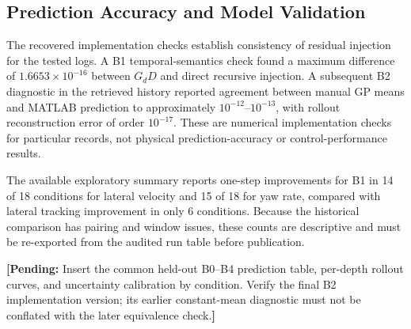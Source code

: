\documentclass[10pt,journal]{IEEEtran}
\newcommand{\pending}[1]{\par\smallskip\noindent\textbf{[Pending:} #1\textbf{]}\par\smallskip}
\begin{document}
\subsection{Prediction Accuracy and Model Validation}
The recovered implementation checks establish consistency of residual injection for the tested logs. A B1 temporal-semantics check found a maximum difference of $1.6653\times10^{-16}$ between $G_dD$ and direct recursive injection. A subsequent B2 diagnostic in the retrieved history reported agreement between manual GP means and MATLAB prediction to approximately $10^{-12}$--$10^{-13}$, with rollout reconstruction error of order $10^{-17}$. These are numerical implementation checks for particular records, not physical prediction-accuracy or control-performance results.

The available exploratory summary reports one-step improvements for B1 in 14 of 18 conditions for lateral velocity and 15 of 18 for yaw rate, compared with lateral tracking improvement in only 6 conditions. Because the historical comparison has pairing and window issues, these counts are descriptive and must be re-exported from the audited run table before publication.
\pending{Insert the common held-out B0--B4 prediction table, per-depth rollout curves, and uncertainty calibration by condition. Verify the final B2 implementation version; its earlier constant-mean diagnostic must not be conflated with the later equivalence check.}
\end{document}
